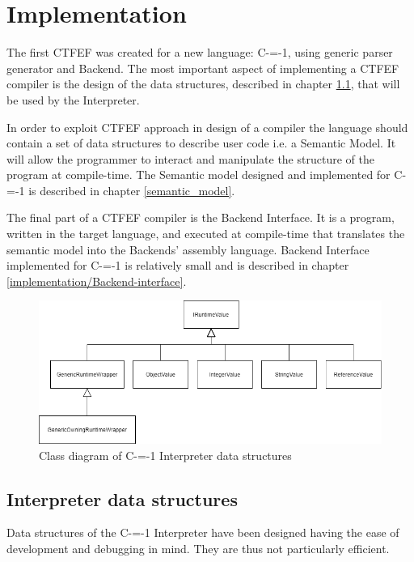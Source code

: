 \section{Implementation}
\label{implementation}

The first CTFEF was created for a new language: C-=-1, using generic parser generator and Backend.
The most important aspect of implementing a CTFEF compiler is the design of the data structures, described in chapter \ref{data_structures}, that will be used by the Interpreter.

In order to exploit CTFEF approach in design of a compiler the language should contain a set of data structures to describe user code i.e. a Semantic Model.
It will allow the programmer to interact and manipulate the structure of the program at compile-time.
The Semantic model designed and implemented for C-=-1 is described in chapter \ref{semantic_model}.

The final part of a CTFEF compiler is the Backend Interface.
It is a program, written in the target language, and executed at compile-time that translates the semantic model into the Backends' assembly language.
Backend Interface implemented for C-=-1 is relatively small and is described in chapter \ref{implementation/Backend-interface}.

\begin{figure}
	\includegraphics[width=15cm]{pictures/Interpreter_data_structures_uml.png}
	\caption{Class diagram of C-=-1 Interpreter data structures}
	\label{fig:Interpreter_data_structures}
\end{figure}

\subsection{Interpreter data structures}
\label{data_structures}
Data structures of the C-=-1 Interpreter have been designed having the ease of development and debugging in mind.
They are thus not particularly efficient.

